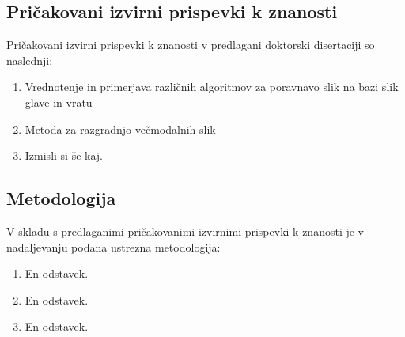 \documentclass[a4paper,twoside,11pt]{article}
\begin{document}
	  
	  
	  
	
	\subsubsection*{}
	\par{}
	\subsection{Pričakovani izvirni prispevki k znanosti}
	\par{\noindent
		Pričakovani izvirni prispevki k znanosti v predlagani doktorski disertaciji so naslednji:
		\begin{enumerate}
			\item Vrednotenje in primerjava različnih algoritmov za poravnavo slik na bazi slik glave in vratu
			\item Metoda za razgradnjo večmodalnih slik
			\item Izmisli si še kaj.

		\end{enumerate}
	}
	\subsection{Metodologija}
	\par{\noindent
		V skladu s predlaganimi pričakovanimi izvirnimi prispevki k znanosti je v nadaljevanju podana ustrezna metodologija:
		\begin{enumerate}
			\item En odstavek.
			\item En odstavek.
			\item En odstavek.
			
		\end{enumerate}
	}
	\renewcommand{\bibsection}{\subsection{Izbrana literatura}}
	\newpage
	\newpage
\end{document}
